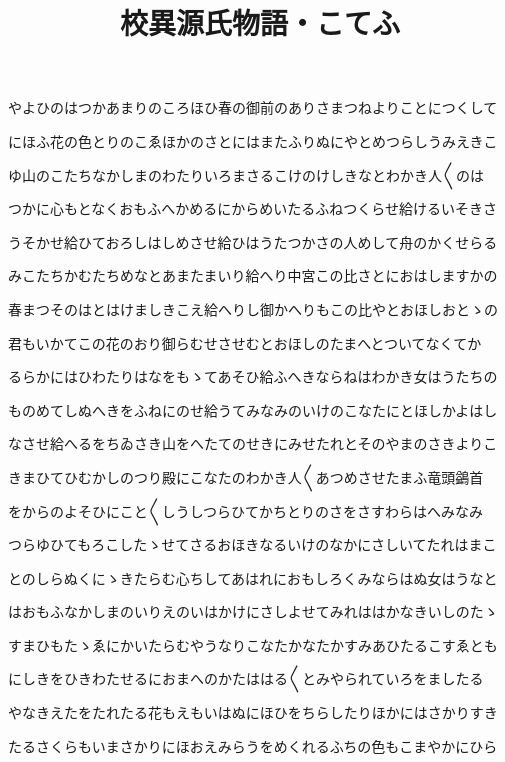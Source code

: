 \documentclass[a4paper,11pt,landscape]{ltjtarticle}
\title{校異源氏物語・こてふ}
\date{}
\begin{document}
\maketitle

やよひのはつかあまりのころほひ春の御前のありさまつねよりことにつくして
\par\medskip
にほふ花の色とりのこゑほかのさとにはまたふりぬにやとめつらしうみえきこ
\par\medskip
ゆ山のこたちなかしまのわたりいろまさるこけのけしきなとわかき人〱のは
\par\medskip
つかに心もとなくおもふへかめるにからめいたるふねつくらせ給けるいそきさ
\par\medskip
うそかせ給ひておろしはしめさせ給ひはうたつかさの人めして舟のかくせらる
\par\medskip
みこたちかむたちめなとあまたまいり給へり中宮この比さとにおはしますかの
\par\medskip
春まつそのはとはけましきこえ給へりし御かへりもこの比やとおほしおとゝの
\par\medskip
君もいかてこの花のおり御らむせさせむとおほしのたまへとついてなくてか
\par\medskip
るらかにはひわたりはなをもゝてあそひ給ふへきならねはわかき女はうたちの
\par\medskip
ものめてしぬへきをふねにのせ給うてみなみのいけのこなたにとほしかよはし
\par\medskip
なさせ給へるをちゐさき山をへたてのせきにみせたれとそのやまのさきよりこ
\par\medskip
きまひてひむかしのつり殿にこなたのわかき人〱あつめさせたまふ竜頭鷁首
\par\medskip
をからのよそひにこと〱しうしつらひてかちとりのさをさすわらはへみなみ
\par\medskip
つらゆひてもろこしたゝせてさるおほきなるいけのなかにさしいてたれはまこ
\par\medskip
とのしらぬくにゝきたらむ心ちしてあはれにおもしろくみならはぬ女はうなと
\par\medskip
はおもふなかしまのいりえのいはかけにさしよせてみれははかなきいしのたゝ
\par\medskip
すまひもたゝゑにかいたらむやうなりこなたかなたかすみあひたるこすゑとも
\par\medskip
にしきをひきわたせるにおまへのかたははる〱とみやられていろをましたる
\par\medskip
やなきえたをたれたる花もえもいはぬにほひをちらしたりほかにはさかりすき
\par\medskip
たるさくらもいまさかりにほおえみらうをめくれるふちの色もこまやかにひら
\end{document}
